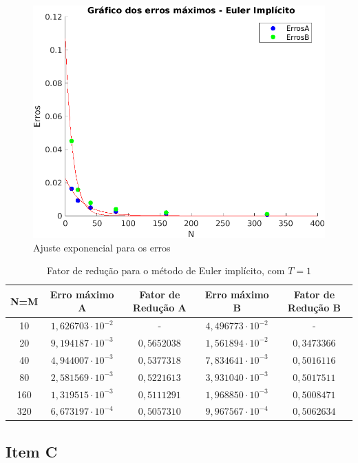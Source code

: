 \documentclass[12pt]{article}
\begin{document}
\begin{spacing}{1.5}
\begin{figure}[ht!]
    \centering
    \includegraphics[width=0.65\linewidth]{Segunda_Tarefa/ItemB/erro_euler.png}
    \caption{Ajuste exponencial para os erros}
    \label{fig:2B_Fit_Erro}
\end{figure} 
\vspace{0.5cm}
\begin{table}[ht]
\centering 
\begin{tabular}{c c c c c} 
\hline\hline 
\rule{0pt}{3ex} 
N=M & Erro máximo A & Fator de Redução A & Erro máximo B & Fator de Redução B\\ [0.5ex] 
\hline 
\rule{0pt}{4ex}
        10  & $1,626703 \cdot 10^{-2}$ &      -        & $4,496773 \cdot 10^{-2}$ &       -      \\ 
        20  & $9,194187 \cdot 10^{-3}$ &  $0,5652038$  & $1,561894 \cdot 10^{-2}$ &  $0,3473366$ \\ 
        40  & $4,944007 \cdot 10^{-3}$ &  $0,5377318$  & $7,834641 \cdot 10^{-3}$ &  $0,5016116$ \\ 
        80  & $2,581569 \cdot 10^{-3}$ &  $0,5221613$  & $3,931040 \cdot 10^{-3}$ &  $0,5017511$ \\ 
        160 & $1,319515 \cdot 10^{-3}$ &  $0,5111291$  & $1,968850 \cdot 10^{-3}$ &  $0,5008471$ \\ 
        320 & $6,673197 \cdot 10^{-4}$ &  $0,5057310$  & $9,967567 \cdot 10^{-4}$ &  $0,5062634$ \\ [1ex]
\hline
\end{tabular}
\caption{Fator de redução para o método de Euler implícito, com $T = 1$} 
\label{table:fator_reducao}
\end{table}

\subsection{Item C}


\end{spacing}
\end{document}

